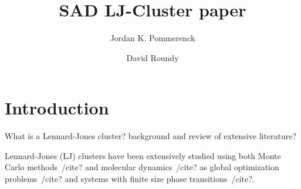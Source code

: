 \documentclass[letterpaper,twocolumn,amsmath,amssymb,pre,aps,10pt]{revtex4-1}
\begin{document}
\title{SAD LJ-Cluster paper
}

\author{Jordan K. Pommerenck} \author{David Roundy}

\begin{abstract}
\end{abstract}

\maketitle

\section{Introduction}
%
%

What is a Lennard-Jones cluster? background and review of extensive literature?

Lennard-Jones (LJ) clusters have been extensively studied using both Monte Carlo methods~/cite{?} and molecular dynamics~/cite{?} as global optimization problems~/cite{?} and
systems with finite size phase transitions~/cite{?}.
\end{document}
